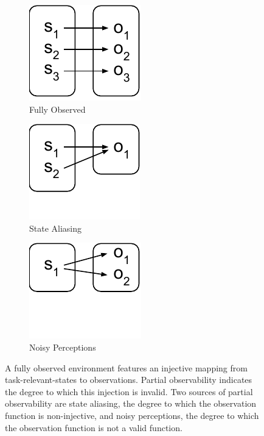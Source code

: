 \documentclass{article} %
\theoremstyle{definition}
\begin{document}
\begin{figure}[htp]
\centering
\begin{subfigure}{.3\textwidth}
  \centering
  \includegraphics[width=.6\linewidth]{figures/bijection}
  \caption{Fully Observed}
  \label{fig:bijection}
\end{subfigure}
\begin{subfigure}{.3\textwidth}
  \centering
  \includegraphics[width=.6\linewidth]{figures/state-aliasing}
  \caption{State Aliasing}
  \label{fig:state-aliasing}
\end{subfigure}
\begin{subfigure}{.3\textwidth}
  \centering
  \includegraphics[width=.6\linewidth]{figures/noisy-perception}
  \caption{Noisy Perceptions}
  \label{fig:noisy-perception}
\end{subfigure}
\caption{A fully observed environment features an injective mapping
  from task-relevant-states to observations. Partial observability
  indicates the degree to which this injection is invalid. Two sources
  of partial observability are state aliasing, the degree to which the
  observation function is non-injective, and noisy perceptions, the
  degree to which the observation function is not a valid function.}
\label{fig:functions}
\end{figure}
\end{document}
